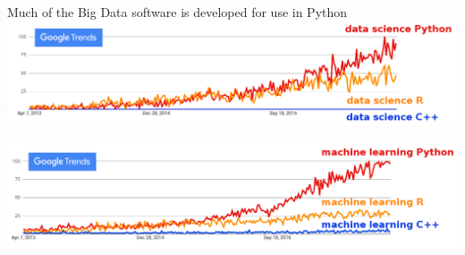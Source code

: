 \documentclass[aspectratio=169]{beamer}
\begin{document}


\begin{frame}{Much of the Big Data software is developed for use in Python}
\vspace{0.5 cm}
\includegraphics[width=\linewidth]{python-r-cpp-googletrends-datascience.png}

\vspace{1 cm}
\includegraphics[width=\linewidth]{python-r-cpp-googletrends-machinelearning.png}
\end{frame}
\end{document}
